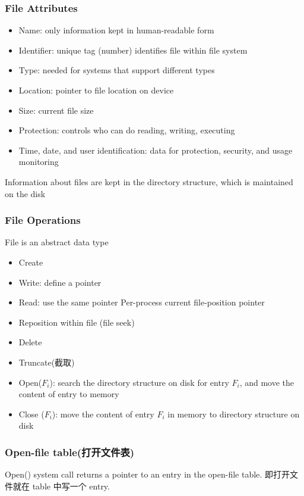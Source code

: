 \subsubsection{File Attributes}
\begin{itemize}\scriptsize
    \item Name: only information kept in human-readable form
    \item Identifier: unique tag (number) identifies file within file system
    \item Type: needed for systems that support different types
    \item Location: pointer to file location on device
    \item Size: current file size
    \item Protection: controls who can do reading, writing, executing
    \item Time, date, and user identification: data for protection, security,
    and usage monitoring
\end{itemize}
Information about files are kept in the directory structure, which is
maintained on the disk

\subsubsection{File Operations}
File is an abstract data type
\begin{itemize}\scriptsize
    \item Create
    \item Write: define a pointer
    \item Read: use the same pointer Per-process current file-position pointer
    \item Reposition within file (file seek)
    \item Delete
    \item Truncate(截取)
    \item Open($F_i$): search the directory structure on disk for entry $F_i$, and move the content of entry to memory
    \item Close ($F_i$): move the content of entry $F_i$ in memory to directory
    structure on disk
\end{itemize}

\subsubsection{Open-file table(打开文件表)}
Open() system call returns a pointer to an entry in the open-file table. 即打开文件就在 table 中写一个 entry. 

